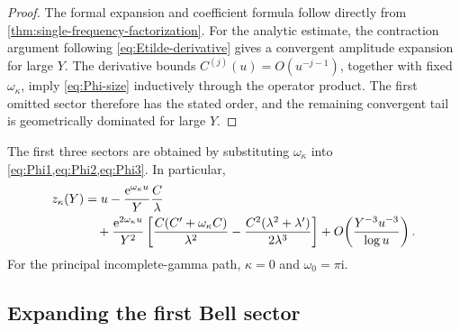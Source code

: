 \documentclass[11pt]{article}
\numberwithin{equation}{section}
\theoremstyle{mainthm}
\theoremstyle{defstyle}
\theoremstyle{remark}
\newcommand{\e}{\mathrm e}
\newcommand{\ii}{\mathrm i}
\begin{document}
\begin{proof}
The formal expansion and coefficient formula follow directly from \cref{thm:single-frequency-factorization}.  For the analytic estimate, the contraction argument following \cref{eq:Etilde-derivative} gives a convergent amplitude expansion for large \(Y\).  The derivative bounds \(C^{(j)}(u)=O(u^{-j-1})\), together with fixed \(\omega_\kappa\), imply \cref{eq:Phi-size} inductively through the operator product.  The first omitted sector therefore has the stated order, and the remaining convergent tail is geometrically dominated for large \(Y\).
\end{proof}

The first three sectors are obtained by substituting \(\omega_\kappa\) into \cref{eq:Phi1,eq:Phi2,eq:Phi3}.  In particular,
\begin{align}
 z_\kappa(Y)
 &=u-\frac{\e^{\omega_\kappa u}}{Y}\frac{C}{\lambda}\notag\\
 &\quad+\frac{\e^{2\omega_\kappa u}}{Y^2}
 \left[
 \frac{C(C'+\omega_\kappa C)}{\lambda^2}
 -\frac{C^2(\lambda^2+\lambda')}{2\lambda^3}
 \right]
 +O\!\left(\frac{Y^{-3}u^{-3}}{\log u}\right).
 \label{eq:subfactorial-first-two-sectors}
\end{align}
For the principal incomplete-gamma path, \(\kappa=0\) and \(\omega_0=\pi\ii\).

\subsection{Expanding the first Bell sector}
\end{document}
